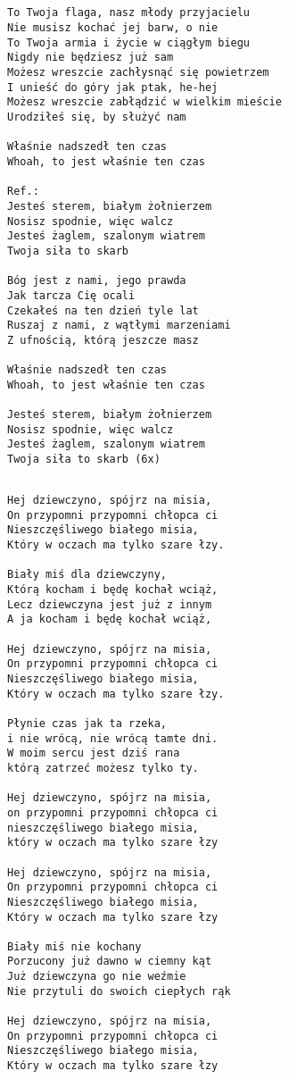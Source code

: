\documentclass[12pt]{article}
\begin{document}
\subsection*{}
\begin{verbatim}
To Twoja flaga, nasz młody przyjacielu
Nie musisz kochać jej barw, o nie
To Twoja armia i życie w ciągłym biegu
Nigdy nie będziesz już sam
Możesz wreszcie zachłysnąć się powietrzem
I unieść do góry jak ptak, he-hej
Możesz wreszcie zabłądzić w wielkim mieście
Urodziłeś się, by służyć nam

Właśnie nadszedł ten czas
Whoah, to jest właśnie ten czas

Ref.:
Jesteś sterem, białym żołnierzem
Nosisz spodnie, więc walcz
Jesteś żaglem, szalonym wiatrem
Twoja siła to skarb

Bóg jest z nami, jego prawda
Jak tarcza Cię ocali
Czekałeś na ten dzień tyle lat
Ruszaj z nami, z wątłymi marzeniami
Z ufnością, którą jeszcze masz

Właśnie nadszedł ten czas
Whoah, to jest właśnie ten czas

Jesteś sterem, białym żołnierzem
Nosisz spodnie, więc walcz
Jesteś żaglem, szalonym wiatrem
Twoja siła to skarb (6x)
\end{verbatim}
\clearpage

\subsection*{}
\begin{verbatim}
Hej dziewczyno, spójrz na misia,
On przypomni przypomni chłopca ci
Nieszczęśliwego białego misia,
Który w oczach ma tylko szare łzy.

Biały miś dla dziewczyny,
Którą kocham i będę kochał wciąż,
Lecz dziewczyna jest już z innym
A ja kocham i będę kochał wciąż,

Hej dziewczyno, spójrz na misia,
On przypomni przypomni chłopca ci
Nieszczęśliwego białego misia,
Który w oczach ma tylko szare łzy.

Płynie czas jak ta rzeka,
i nie wrócą, nie wrócą tamte dni.
W moim sercu jest dziś rana
którą zatrzeć możesz tylko ty.

Hej dziewczyno, spójrz na misia,
on przypomni przypomni chłopca ci
nieszczęśliwego białego misia,
który w oczach ma tylko szare łzy

Hej dziewczyno, spójrz na misia,
On przypomni przypomni chłopca ci
Nieszczęśliwego białego misia,
Który w oczach ma tylko szare łzy

Biały miś nie kochany
Porzucony już dawno w ciemny kąt
Już dziewczyna go nie weźmie
Nie przytuli do swoich ciepłych rąk

Hej dziewczyno, spójrz na misia,
On przypomni przypomni chłopca ci
Nieszczęśliwego białego misia,
Który w oczach ma tylko szare łzy
\end{verbatim}
\clearpage
\end{document}
